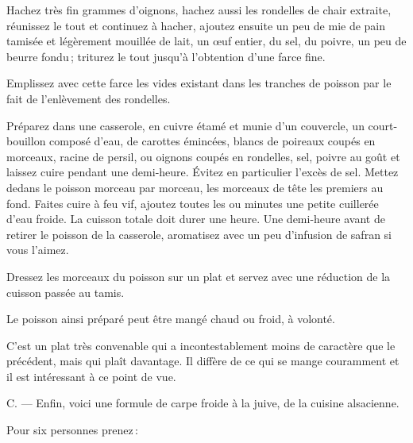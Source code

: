 Hachez très fin {\mmm} grammes d'oignons, hachez aussi les rondelles de
chair extraite, réunissez le tout et continuez à hacher, ajoutez ensuite un peu
de mie de pain tamisée et légèrement mouillée de lait, un œuf entier, du sel,
du poivre, un peu de beurre fondu ; triturez le tout jusqu'à l'obtention d’une
farce fine.

Emplissez avec cette farce les vides existant dans les tranches de poisson par
le fait de l'enlèvement des rondelles.

Préparez dans une casserole, en cuivre étamé et munie d'un couvercle, un
court-bouillon composé d'eau, de {\mmm} carottes émincées, {\mmm}
blancs de poireaux coupés en morceaux, {\mmm} racine de persil,
{\mmm} ou {\mmm} oignons coupés en rondelles, sel, poivre au goût et
laissez cuire pendant une demi-heure. Évitez en particulier l'excès de sel.
Mettez dedans le poisson morceau par morceau, les morceaux de tête les premiers
au fond. Faites cuire à feu vif, ajoutez toutes les {\mmm} ou {\mmm}
minutes une petite cuillerée d'eau froide. La cuisson totale doit durer une
heure. Une demi-heure avant de retirer le poisson de la casserole, aromatisez
avec un peu d'infusion de safran si vous l'aimez.

Dressez les morceaux du poisson sur un plat et servez avec une réduction de la
cuisson passée au tamis.

Le poisson ainsi préparé peut être mangé chaud ou froid, à volonté.

C'est un plat très convenable qui a incontestablement moins de caractère que
le précédent, mais qui plaît davantage. Il diffère de ce qui se mange couramment
et il est intéressant à ce point de vue.

\sk


C. — Enfin, voici une formule de carpe froide à la juive, de la cuisine
alsacienne.

\medskip

Pour six personnes prenez :

